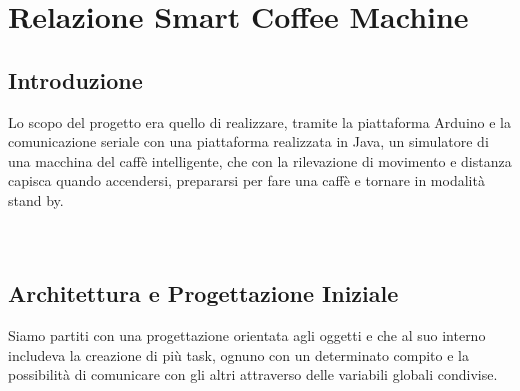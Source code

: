 \documentclass[a4paper]{article}
\begin{document}
\section*{Relazione Smart Coffee Machine} 
\subsection*{Introduzione}
Lo scopo del progetto era quello di realizzare, tramite la piattaforma Arduino e la comunicazione seriale con una piattaforma realizzata in Java, un simulatore di una macchina del caffè intelligente, che con la rilevazione di movimento e distanza capisca quando accendersi, prepararsi per fare una caffè e tornare in modalità stand by.
\\
\\
\\
\subsection*{Architettura e Progettazione Iniziale}
Siamo partiti con una progettazione orientata agli oggetti e che al suo interno includeva la creazione di più task, ognuno con un determinato compito e la possibilità di comunicare con gli altri attraverso delle variabili globali condivise.
\end{document}
